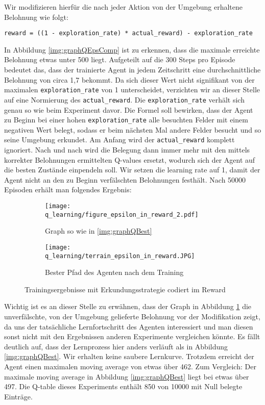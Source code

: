 Wir modifizieren hierfür die nach jeder Aktion von der Umgebung erhaltene Belohnung wie folgt:
\begin{verbatim}
reward = ((1 - exploration_rate) * actual_reward) - exploration_rate
\end{verbatim}
In Abbildung \ref{img:graphQEpsComp} ist zu erkennen, dass die maximale erreichte Belohnung etwas unter 500 liegt. Aufgeteilt auf die 300 Steps pro Episode bedeutet das, dass der trainierte Agent in jedem Zeitschritt eine durchschnittliche Belohnung von circa 1,7 bekommt. Da sich dieser Wert nicht signifikant von der maximalen \texttt{exploration_rate} von 1 unterscheidet, verzichten wir an dieser Stelle auf eine Normierung des \texttt{actual_reward}. Die \texttt{exploration_rate} verhält sich genau so wie beim Experiment davor. Die Formel soll bewirken, dass der Agent zu Beginn bei einer hohen \texttt{exploration_rate} alle besuchten Felder mit einem negativen Wert belegt, sodass er beim nächsten Mal andere Felder besucht und so seine Umgebung erkundet. Am Anfang wird der \texttt{actual_reward} komplett ignoriert. Nach und nach wird die Belegung dann immer mehr mit den mittels korrekter Belohnungen ermittelten Q-values ersetzt, wodurch sich der Agent auf die besten Zustände einpendeln soll. Wir setzen die learning rate auf 1, damit der Agent nicht an den zu Beginn verfälschten Belohnungen festhält. Nach 50000 Episoden erhält man folgendes Ergebnis:
\begin{figure}[H]
    \centering
    \begin{subfigure}[b]{0.49\textwidth}
        \texttt{[image: q\_learning/figure\_epsilon\_in\_reward\_2.pdf]}
        \caption{Graph so wie in \ref{img:graphQBest}}
        \label{img:graphQEpsInRew}
    \end{subfigure}
    \begin{subfigure}[b]{0.49\textwidth}
        \texttt{[image: q\_learning/terrain\_epsilon\_in\_reward.JPG]}
        \caption{Bester Pfad des Agenten nach dem Training}
        \label{img:pathQEpsInRew}
    \end{subfigure}
    \caption{Trainingsergebnisse mit Erkundungsstrategie codiert im Reward}
\end{figure}
Wichtig ist es an dieser Stelle zu erwähnen, dass der Graph in Abbildung \ref{img:graphQEpsInRew} die unverfälschte, von der Umgebung gelieferte Belohnung vor der Modifikation zeigt, da uns der tatsächliche Lernfortschritt des Agenten interessiert und man diesen sonst nicht mit den Ergebnissen anderen Experimente vergleichen könnte. Es fällt deutlich auf, dass der Lernprozess hier anders verläuft als in Abbildung \ref{img:graphQBest}. Wir erhalten keine saubere Lernkurve. Trotzdem erreicht der Agent einen maximalen moving average von etwas über 462. Zum Vergleich: Der maximale moving average in Abbildung \ref{img:graphQBest} liegt bei etwas über 497. Die Q-table dieses Experiments enthält 850 von 10000 mit Null belegte Einträge.

